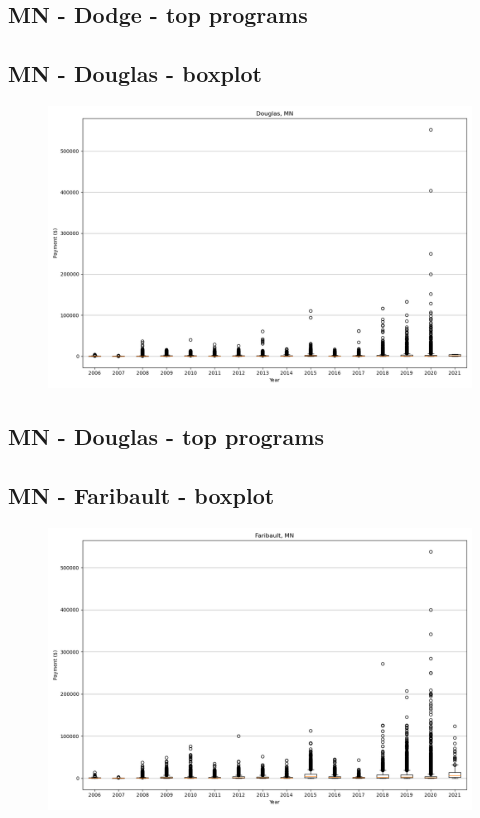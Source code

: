 \subsection*{MN - Dodge - top programs}

\newpage
\subsection*{MN - Douglas - boxplot}
\begin{figure}[h]
\centering
\includegraphics[width=7in]{../output/boxplots/counties/Douglas-MN_boxplot.png}
\end{figure}


\subsection*{MN - Douglas - top programs}

\newpage
\subsection*{MN - Faribault - boxplot}
\begin{figure}[h]
\centering
\includegraphics[width=7in]{../output/boxplots/counties/Faribault-MN_boxplot.png}
\end{figure}


